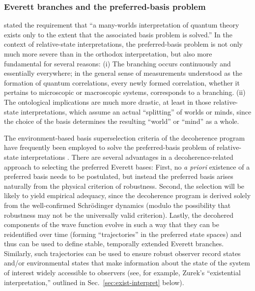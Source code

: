 \documentclass[twocolumn,rmp,aps,amsmath,amsfonts,noshowkeys,noshowpacs]{revtex4}
\begin{document}
\subsubsection{Everett branches and the preferred-basis problem}

\citet[p.~1043]{Stapp:2002:pc} stated the requirement that ``a
many-worlds interpretation of quantum theory exists only to the extent
that the associated basis problem is solved.'' In the context of
relative-state interpretations, the preferred-basis problem is not
only much more severe than in the orthodox interpretation, but also
more fundamental for several reasons: (i) The branching occurs
continuously and essentially everywhere; in the general sense of
measurements understood as the formation of quantum correlations,
every newly formed correlation, whether it pertains to microscopic or
macroscopic systems, corresponds to a branching. (ii) The ontological
implications are much more drastic, at least in those relative-state
interpretations, which assume an actual ``splitting'' of worlds or
minds, since the choice of the basis determines the resulting
``world'' or ``mind'' as a whole.

The environment-based basis superselection criteria of the decoherence
program have frequently been employed to solve the preferred-basis
problem of relative-state interpretations \citep[see, for
example,][]{Zurek:1998:re,Butterfield:2001:ua,Wallace:2003:iq,Wallace:2003:iz}.
There are several advantages in a decoherence-related approach to
selecting the preferred Everett bases: First, no \emph{a priori}
existence of a preferred basis needs to be postulated, but instead the
preferred basis arises naturally from the physical criterion of
robustness.  Second, the selection will be likely to yield empirical
adequacy, since the decoherence program is derived solely from the
well-confirmed Schr\"odinger dynamics (modulo the possibility that
robustness may not be the universally valid criterion).  Lastly, the
decohered components of the wave function evolve in such a way that
they can be reidentified over time (forming ``trajectories'' in the
preferred state spaces) and thus can be used to define stable,
temporally extended Everett branches. Similarly, such trajectories can
be used to ensure robust observer record states and/or environmental
states that make information about the state of the system of interest
widely accessible to observers (see, for example, Zurek's
``existential interpretation,'' outlined in
Sec.~\ref{sec:exist-interpret} below).
\end{document}
